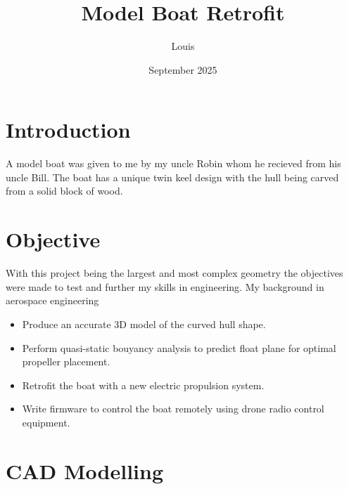 \documentclass{article}
\begin{document}
\title{Model Boat Retrofit}
\author{Louis}
\date{September 2025}
\maketitle 

\section{Introduction}



A model boat was given to me by my uncle Robin whom he recieved from his uncle Bill.
The boat has a unique twin keel design with the hull being carved from a solid block of wood.

\section{Objective}

With this project being the largest and most complex geometry the objectives were made to test and further my skills in engineering.
My background in aerospace engineering 

\begin{itemize}
    \item Produce an accurate 3D model of the curved hull shape.
    \item Perform quasi-static bouyancy analysis to predict float plane for optimal propeller placement.
    \item Retrofit the boat with a new electric propulsion system.
    \item Write firmware to control the boat remotely using drone radio control equipment.
\end{itemize}

\section{CAD Modelling}
\end{document}
